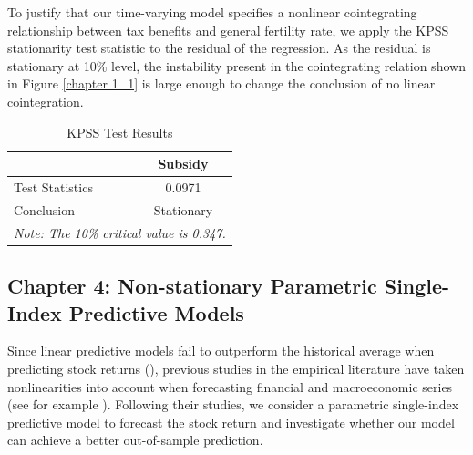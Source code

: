 \documentclass[a4paper,12pt,times,numbered,print,index]{report}
\numberwithin{equation}{section}
\begin{document}
To justify that our time-varying model specifies a nonlinear cointegrating relationship between tax benefits and general fertility rate, we apply the KPSS stationarity test statistic to the residual of the regression. As the residual is stationary at 10\% level, the instability present in the cointegrating relation shown in Figure \ref{chapter 1_1} is large enough to change the conclusion of no linear cointegration. 
\begin{table}[!htp]
	\centering
	\caption{KPSS Test Results }
	\begin{tabular}{ll}
		\toprule
		& \multicolumn{1}{c}{Subsidy} \\
		\midrule
		Test Statistics & \multicolumn{1}{c}{0.0971} \\
		Conclusion & \multicolumn{1}{c}{Stationary} \\
		\midrule
		\multicolumn{2}{l}{\textit{\footnotesize{Note: The 10\% critical value is 0.347. }}} \\
	\end{tabular}%
	\label{tab:addlabel}%
\end{table}%
\pagebreak

\subsection*{Chapter 4: Non-stationary Parametric Single-Index Predictive Models}
Since linear predictive models fail to outperform the historical average when predicting stock returns (\cite{welch2008comprehensive}), previous studies in the empirical literature have taken nonlinearities into account when forecasting financial and macroeconomic series (see for example \cite{wooldridge1994estimation}). Following their studies, we consider a parametric single-index predictive model to forecast the stock return and investigate whether our model can achieve a better out-of-sample prediction.

%
\end{document}
